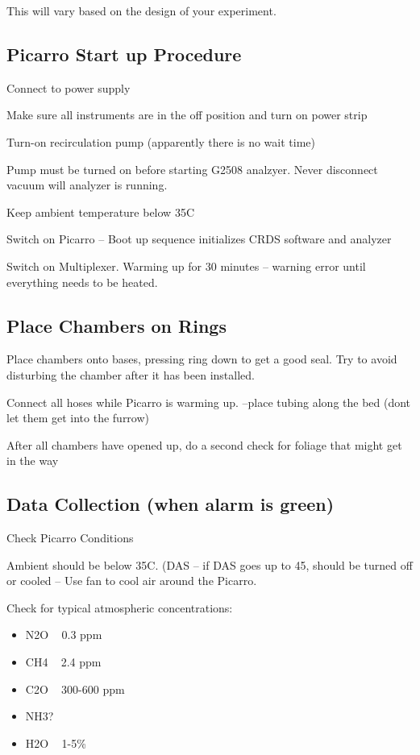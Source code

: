 \documentclass[12pt]{../SOP3}\usepackage[]{graphicx}\usepackage[]{color}
\begin{document}
\NP This will vary based on the design of your experiment. 

\subsection*{Picarro Start up Procedure}

\NP Connect to power supply

\NP Make sure all instruments are in the off position and turn on power strip

\NP Turn-on recirculation pump (apparently there is no wait time)

\NP Pump must be turned on before starting G2508 analzyer. Never disconnect vacuum will analyzer is running.

\NP Keep ambient temperature below 35\degree C

\NP Switch on Picarro  -- Boot up sequence initializes CRDS software and analyzer

\NP Switch on Multiplexer. Warming up for 30 minutes -- warning error until everything needs to be heated.

\subsection*{Place Chambers on Rings}

\NP Place chambers onto bases, pressing ring down to get a good seal. Try to avoid disturbing the chamber after it has been installed. 

\NP Connect all hoses while Picarro is warming up. --place tubing along the bed (dont let them get into the furrow)

\NP After all chambers have opened up, do a second check for foliage that might get in the way

\subsection*{Data Collection (when alarm is green)}

\NP Check Picarro Conditions

\NP Ambient should be below 35\degree C. (DAS -- if DAS goes up to 45\degree, should be turned off or cooled -- Use fan to cool air around the Picarro.
                               
\NP Check for typical atmospheric concentrations:
                                 
\begin{itemize}
  \item N2O ~ 0.3 ppm
  \item CH4 ~ 2.4 ppm
  \item C2O ~ 300-600 ppm
  \item NH3?
  \item H2O ~ 1-5\%
\end{itemize}
                               
\end{document}
